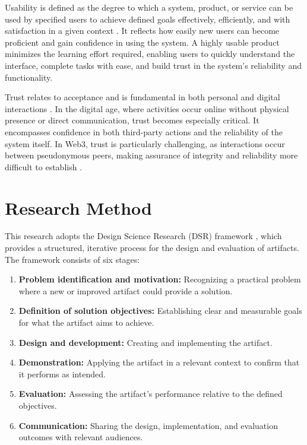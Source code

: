 \documentclass[10pt,conference]{IEEEtran}
\begin{document}
Usability is defined as the degree to which a system, product, or service can be used by specified users to achieve defined goals effectively, efficiently, and with satisfaction in a given context \cite{Razak2011}. It reflects how easily new users can become proficient and gain confidence in using the system. A highly usable product minimizes the learning effort required, enabling users to quickly understand the interface, complete tasks with ease, and build trust in the system’s reliability and functionality.

Trust relates to acceptance and is fundamental in both personal and digital interactions \cite{Boughton2024}. In the digital age, where activities occur online without physical presence or direct communication, trust becomes especially critical. It encompasses confidence in both third-party actions and the reliability of the system itself. In Web3, trust is particularly challenging, as interactions occur between pseudonymous peers, making assurance of integrity and reliability more difficult to establish \cite{Ottosen2026}.


\section{Research Method} \label{sec:researchmethod}

This research adopts the Design Science Research (DSR) framework \cite{Hevner2004,Peffers2007}, which provides a structured, iterative process for the design and evaluation of artifacts. The framework consists of six stages:

\begin{enumerate}
    \item \textbf{Problem identification and motivation:} Recognizing a practical problem where a new or improved artifact could provide a solution.
    \item \textbf{Definition of solution objectives:} Establishing clear and measurable goals for what the artifact aims to achieve.
    \item \textbf{Design and development:} Creating and implementing the artifact.
    \item \textbf{Demonstration:} Applying the artifact in a relevant context to confirm that it performs as intended.
    \item \textbf{Evaluation:} Assessing the artifact’s performance relative to the defined objectives.
    \item \textbf{Communication:} Sharing the design, implementation, and evaluation outcomes with relevant audiences.
\end{enumerate}
\end{document}
